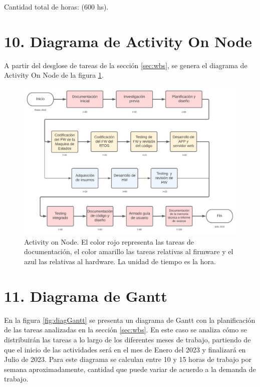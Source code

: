 \documentclass[
11pt, %
]{charter}
\begin{document}
Cantidad total de horas: (600 hs).

\section{10. Diagrama de Activity On Node}
\label{sec:AoN}

A partir del desglose de tareas de la sección \ref{sec:wbs}, se genera el diagrama de Activity On Node de la figura \ref{fig:AoN}.

\begin{figure}[htpb]
\centering 
\includegraphics[width=1\textwidth]{./Figuras/diagAoN.png}
\caption{Activity on Node. El color rojo representa las tareas de documentación, el color amarillo las tareas relativas al firmware y el azul las relativas al hardware. La unidad de tiempo es la hora.}
\label{fig:AoN}
\end{figure}

\section{11. Diagrama de Gantt}
\label{sec:gantt}

En la figura \ref{fig:diagGantt} se presenta un diagrama de Gantt con la planificación de las tareas analizadas en la sección \ref{sec:wbs}. En este caso se analiza cómo se distribuirán las tareas a lo largo de los diferentes meses de trabajo, partiendo de que el inicio de las actividades será en el mes de Enero del 2023 y finalizará en Julio de 2023. Para este diagrama se calculan entre 10 y 15 horas de trabajo por semana aproximadamente, cantidad que puede variar de acuerdo a la demanda de trabajo.
\end{document}
